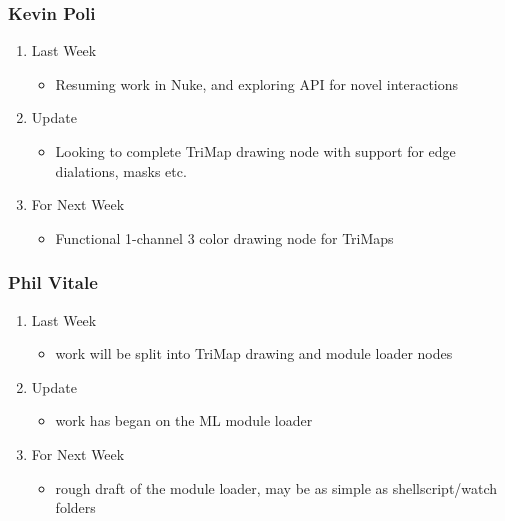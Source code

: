 \documentclass[15pt]{article}
\begin{document}
\subsubsection{Kevin Poli}
\label{sec:org3f240e7}
\begin{enumerate}
\item Last Week
\label{sec:org4b0abf7}
\begin{itemize}
\item Resuming work in Nuke, and exploring API for novel interactions
\end{itemize}
\item Update
\label{sec:orgf44ce66}
\begin{itemize}
\item Looking to complete TriMap drawing node with support for edge dialations, masks etc.
\end{itemize}
\item For Next Week
\label{sec:orgb6ac926}
\begin{itemize}
\item Functional 1-channel 3 color drawing node for TriMaps
\end{itemize}
\end{enumerate}
\subsubsection{Phil Vitale}
\label{sec:org058af40}
\begin{enumerate}
\item Last Week
\label{sec:org17c4624}
\begin{itemize}
\item work will be split into TriMap drawing and module loader nodes
\end{itemize}
\item Update
\label{sec:orgc627a1a}
\begin{itemize}
\item work has began on the ML module loader
\end{itemize}
\item For Next Week
\label{sec:orgcb10d61}
\begin{itemize}
\item rough draft of the module loader, may be as simple as shellscript/watch folders
\end{itemize}
\end{enumerate}
\end{document}
